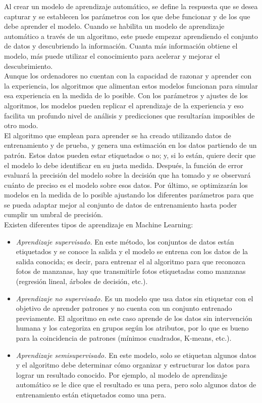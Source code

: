 Al crear un modelo de aprendizaje automático, se define la respuesta que se desea capturar y se establecen los parámetros con los que debe funcionar y de los que debe aprender el modelo. Cuando se habilita un modelo de aprendizaje automático a través de un algoritmo, este puede empezar aprendiendo el conjunto de datos y descubriendo la información. Cuanta más información obtiene el modelo, más puede utilizar el conocimiento para acelerar y mejorar el descubrimiento.\\ 

Aunque los ordenadores no cuentan con la capacidad de razonar y aprender con la experiencia, los algoritmos que alimentan estos modelos funcionan para simular esa experiencia en la medida de lo posible. Con los parámetros y ajustes de los algoritmos, los modelos pueden replicar el aprendizaje de la experiencia y eso facilita un profundo nivel de análisis y predicciones que resultarían imposibles de otro modo. \\

El algoritmo que emplean para aprender se ha creado utilizando datos de entrenamiento y de prueba, y genera una estimación en los datos partiendo de un patrón. Estos datos pueden estar etiquetados o no; y, si lo están, quiere decir que el modelo lo debe identificar en su justa medida. Después, la función de error evaluará la precisión del modelo sobre la decisión que ha tomado y se observará cuánto de preciso es el modelo sobre esos datos. Por último, se optimizarán los modelos en la medida de lo posible ajustando los diferentes parámetros para que se pueda adaptar mejor al conjunto de datos de entrenamiento hasta poder cumplir un umbral de precisión.\\ 



Existen diferentes tipos de aprendizaje en Machine Learning: 

\begin{itemize}
 \item \textit{Aprendizaje supervisado.} En este método, los conjuntos de datos están etiquetados y se conoce la salida y el modelo se entrena con los datos de la salida conocida; es decir, para entrenar el al algoritmo para que reconozca fotos de manzanas, hay que transmitirle fotos etiquetadas como manzanas (regresión lineal, árboles de decisión, etc.).
 \item \textit{Aprendizaje no supervisado.} Es un modelo que usa datos sin etiquetar con el objetivo de aprender patrones y no cuenta con un conjunto entrenado previamente. El algoritmo en este caso aprende de los datos sin intervención humana y los categoriza en grupos según los atributos, por lo que es bueno para la coincidencia de patrones (mínimos cuadrados, K-means, etc.).
 \item \textit{Aprendizaje semisupervisado.} En este modelo, solo se etiquetan algunos datos y el algoritmo debe determinar cómo organizar y estructurar los datos para lograr un resultado conocido. Por ejemplo, al modelo de aprendizaje automático se le dice que el resultado es una pera, pero solo algunos datos de entrenamiento están etiquetados como una pera.
\end{itemize}\

